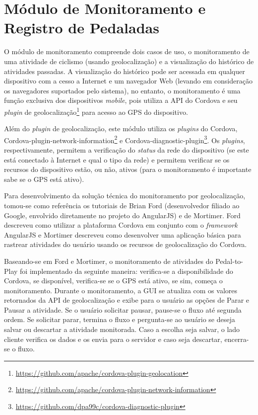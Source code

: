 \section{Módulo de Monitoramento e Registro de Pedaladas}
O módulo de monitoramento compreende dois casos de uso, o monitoramento de uma atividade de ciclismo (usando geolocalização) e a visualização do histórico de atividades passadas. A visualização do histórico pode ser acessada em qualquer dispositivo com a cesso a Internet e um navegador Web (levando em consideração os navegadores suportados pelo sistema), no entanto, o monitoramento é uma função exclusiva dos dispositivos \textit{mobile}, pois utiliza a API do Cordova e seu \textit{plugin} de geolocalização\footnote{\url{https://github.com/apache/cordova-plugin-geolocation}} para acesso ao GPS do dispositivo.
\par
Além do \textit{plugin} de geolocalização, este módulo utiliza os \textit{plugins} do Cordova, Cordova-plugin-network-information\footnote{\url{https://github.com/apache/cordova-plugin-network-information}} e Cordova-diagnostic-plugin\footnote{\url{https://github.com/dpa99c/cordova-diagnostic-plugin}}. Os \textit{plugins}, respectivamente, permitem a verificação do \textit{status} da rede do dispositivo (se este está conectado à Internet e qual o tipo da rede) e permitem verificar se os recursos do dispositivo estão, ou não, ativos (para o monitoramento é importante sabe se o GPS está ativo).
\par
Para desenvolvimento da solução técnica do monitoramento por geolocalização, tomou-se como referência os tutoriais de Brian Ford (desenvolvedor filiado ao Google, envolvido diretamente no projeto do AngularJS)\citeyearpar{fordCordova} e de Mortimer\citeyearpar{mortimer2012}. Ford descreveu como utilizar a plataforma Cordova em conjunto com o \textit{framework} AngularJS e Mortimer descreveu como desenvolver uma aplicação básica para rastrear atividades do usuário usando os recursos de geolocalização do Cordova.
\par
Baseando-se em Ford e Mortimer, o monitoramento de atividades do Pedal-to-Play foi implementado da seguinte maneira: verifica-se a disponibilidade do Cordova, se disponível, verifica-se se o GPS está ativo, se sim, começa o monitoramento. Durante o monitoramento, a GUI se atualiza com os valores retornados da API de geolocalização e exibe para o usuário as opções de Parar e Pausar a atividade. Se o usuário solicitar pausar, pause-se o fluxo até segunda ordem. Se solicitar parar, termina o fluxo e pergunta-se ao usuário se deseja salvar ou descartar a atividade monitorada. Caso a escolha seja salvar, o lado cliente verifica os dados e os envia para o servidor e caso seja descartar, encerra-se o fluxo.
